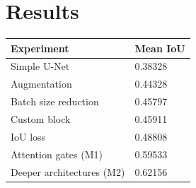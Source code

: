 \documentclass[11pt]{article}
\begin{document}
\begin{multicols}{2}


      \label{sec:results}
      \section{Results}

      \begin{table}[H]
            \label{tab:results}
            \centering
            \setlength{\tabcolsep}{3pt}
            \begin{tabularx}{\linewidth}{lY}
                \toprule
                Experiment & Mean IoU \\
                \midrule
                Simple U-Net & 0.38328 \\
                Augmentation & 0.44328 \\
                Batch size reduction & 0.45797 \\
                Custom block & 0.45911 \\
                IoU loss & 0.48808 \\
                Attention gates (M1) & 0.59533 \\
                Deeper architectures (M2) & 0.62156 \\
                \bottomrule
            \end{tabularx}
      \end{table}


\end{multicols}
\end{document}
